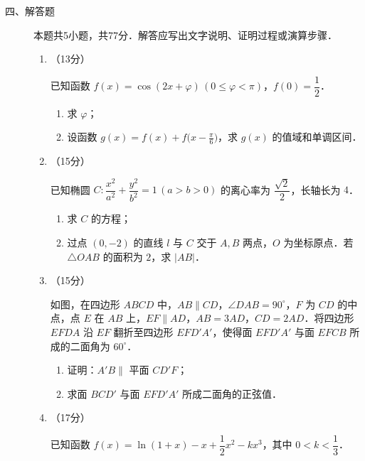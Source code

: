 \begin{description}
    \item[四、解答题] 本题共5小题，共77分．解答应写出文字说明、证明过程或演算步骤．
    \begin{enumerate}[leftmargin=5pt]
      \addtocounter{enumi}{+14}
        \item （13分）

        已知函数 $f(x)=\cos(2x+\varphi)\,(0\leqslant\varphi<\pi)$，$f(0)=\dfrac{1}{2}$．

        \begin{enumerate}[label=(\arabic*)]
            \item 求 $\varphi$；
            \item 设函数 $g(x)=f(x)+f\bigl(x-\frac{\pi}{6}\bigr)$，求 $g(x)$ 的值域和单调区间．
        \end{enumerate}

        \item （15分）

        已知椭圆 $C:\dfrac{x^2}{a^2}+\dfrac{y^2}{b^2}=1\,(a>b>0)$ 的离心率为 $\dfrac{\sqrt{2}}{2}$，长轴长为 $4$．

        \begin{enumerate}[label=(\arabic*)]
            \item 求 $C$ 的方程；
            \item 过点 $(0,-2)$ 的直线 $l$ 与 $C$ 交于 $A,B$ 两点，$O$ 为坐标原点．若 $\triangle OAB$ 的面积为 $2$，求 $|AB|$．
        \end{enumerate}

        \item （15分）

        如图，在四边形 $ABCD$ 中，$AB\parallel CD$，$\angle DAB=90^\circ$，$F$ 为 $CD$ 的中点，点 $E$ 在 $AB$ 上，$EF\parallel AD$，$AB=3AD$，$CD=2AD$．将四边形 $EFDA$ 沿 $EF$ 翻折至四边形 $EFD'A'$，使得面 $EFD'A'$ 与面 $EFCB$ 所成的二面角为 $60^\circ$．

        \begin{enumerate}[label=(\arabic*)]
            \item 证明：$A'B\parallel$ 平面 $CD'F$；
            \item 求面 $BCD'$ 与面 $EFD'A'$ 所成二面角的正弦值．
        \end{enumerate}

        \item （17分）

        已知函数 $f(x)=\ln(1+x)-x+\dfrac{1}{2}x^2-kx^3$，其中 $0<k<\dfrac{1}{3}$．


\end{enumerate}
\end{description}
